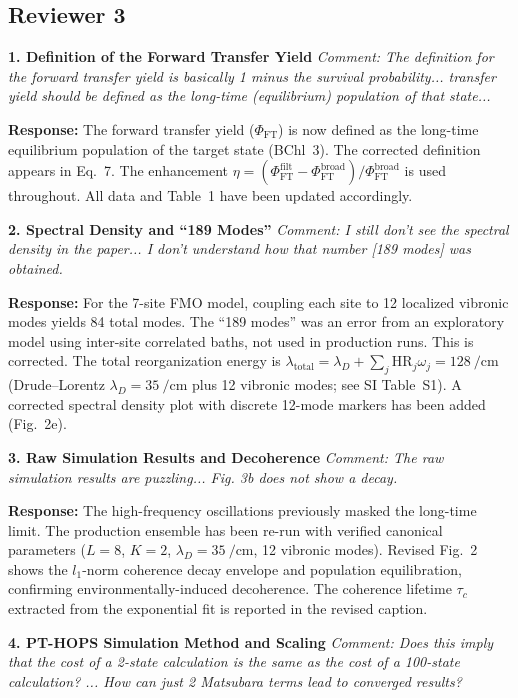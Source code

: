 \documentclass[11pt]{article}
\begin{document}
\subsection*{Reviewer 3}

\textbf{1. Definition of the Forward Transfer Yield}
\textit{Comment: The definition for the forward transfer yield is basically 1 minus the survival probability... transfer yield should be defined as the long-time (equilibrium) population of that state...}

\textbf{Response:} The forward transfer yield ($\Phi_{\mathrm{FT}}$) is now defined as the long-time equilibrium population of the target state (BChl~3). The corrected definition appears in Eq.~7. The enhancement $\eta = (\Phi_{\mathrm{FT}}^{\mathrm{filt}} - \Phi_{\mathrm{FT}}^{\mathrm{broad}})/\Phi_{\mathrm{FT}}^{\mathrm{broad}}$ is used throughout. All data and Table~1 have been updated accordingly.

\textbf{2. Spectral Density and ``189 Modes''}
\textit{Comment: I still don't see the spectral density in the paper... I don't understand how that number [189 modes] was obtained.}

\textbf{Response:} For the 7-site FMO model, coupling each site to 12 localized vibronic modes yields 84 total modes. The ``189 modes'' was an error from an exploratory model using inter-site correlated baths, not used in production runs. This is corrected. The total reorganization energy is $\lambda_{\mathrm{total}} = \lambda_D + \sum_j \mathrm{HR}_j \omega_j = \SI{128}{\per\centi\meter}$ (Drude--Lorentz $\lambda_D = \SI{35}{\per\centi\meter}$ plus 12 vibronic modes; see SI Table~S1). A corrected spectral density plot with discrete 12-mode markers has been added (Fig.~2e).

\textbf{3. Raw Simulation Results and Decoherence}
\textit{Comment: The raw simulation results are puzzling... Fig. 3b does not show a decay.}

\textbf{Response:} The high-frequency oscillations previously masked the long-time limit. The production ensemble has been re-run with verified canonical parameters ($L=8$, $K=2$, $\lambda_D = \SI{35}{\per\centi\meter}$, 12 vibronic modes). Revised Fig.~2 shows the $l_1$-norm coherence decay envelope and population equilibration, confirming environmentally-induced decoherence. The coherence lifetime $\tau_c$ extracted from the exponential fit is reported in the revised caption.

\textbf{4. PT-HOPS Simulation Method and Scaling}
\textit{Comment: Does this imply that the cost of a 2-state calculation is the same as the cost of a 100-state calculation? ... How can just 2 Matsubara terms lead to converged results?}
\end{document}
